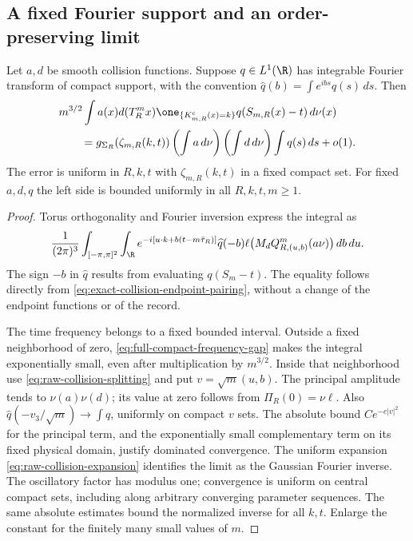 \subsection{A fixed Fourier support and an order-preserving limit}
\begin{lemma}
\label{lem:bandlimited-collision-local}
Let $a,d$ be smooth collision functions. Suppose $q\in L^1(\R)$
has integrable Fourier transform of compact support, with the convention
$\widehat q(b)=\int e^{ibs}q(s)\,ds$. Then
\begin{align}
 &m^{3/2}\int a(x)d(T_R^m x)
   \one_{\{K^{\rm c}_{m,R}(x)=k\}}q(S_{m,R}(x)-t)\,d\nu(x)
 \notag\\
 &\qquad =g_{\Sigma_R}(\zeta_{m,R}(k,t))
             \left(\int a\,d\nu\right)
             \left(\int d\,d\nu\right)\int q(s)\,ds+o(1).
 \label{eq:bandlimited-collision-local}
\end{align}
The error is uniform in $R,k,t$ with $\zeta_{m,R}(k,t)$ in a fixed
compact set. For fixed $a,d,q$ the left side is bounded uniformly
in all $R,k,t,m\ge1$.
\end{lemma}
\begin{proof}
Torus orthogonality and Fourier inversion express the integral as
\begin{equation}\label{eq:bandlimited-collision-pairing}
 \frac1{(2\pi)^3}\int_{[-\pi,\pi]^2}\int_\R
 e^{-i[u\cdot k+b(t-m\bar\tau_R)]}\widehat q(-b)
 \ell\bigl(M_d Q_{R,(u,b)}^m(a\nu)\bigr)\,db\,du.
\end{equation}
The sign $-b$ in $\widehat q$ results from evaluating $q(S_m-t)$.
The equality follows directly from
\eqref{eq:exact-collision-endpoint-pairing}, without a change of the
endpoint functions or of the record.

The time frequency belongs to a fixed bounded interval. Outside a
fixed neighborhood of zero,
\eqref{eq:full-compact-frequency-gap} makes the integral exponentially
small, even after multiplication by $m^{3/2}$. Inside that neighborhood
use \eqref{eq:raw-collision-splitting} and put $v=\sqrt m(u,b)$.
The principal amplitude tends to $\nu(a)\nu(d)$; its value at zero
follows from $\Pi_R(0)=\nu\ell$. Also
$\widehat q(-v_3/\sqrt m)\to\int q$, uniformly on compact $v$ sets.
The absolute bound $C e^{-c|v|^2}$ for the principal term, and the
exponentially small complementary term on its fixed physical domain,
justify dominated convergence. The uniform expansion
\eqref{eq:raw-collision-expansion} identifies the limit as the Gaussian
Fourier inverse. The oscillatory factor has modulus one; convergence
is uniform on central compact sets, including along arbitrary
converging parameter sequences. The same absolute estimates bound the
normalized inverse for all $k,t$. Enlarge the constant for the
finitely many small values of $m$.
\end{proof}

